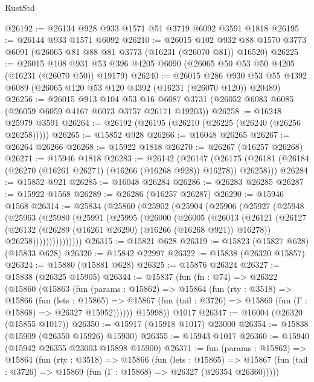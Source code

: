 \begin{lexlean}{RustStd}
\begin{coremodule}
@26192 := @26134 @928 @933 @1571 @51 @3719 @6092 @3591 @1818
@26195 := @26144 @933 @1571 @6092
@26210 := @26015
    @102
    @932
    @88
    @1570
    @3773
    @6091
    (@26065 @81 @88 @81 @3773 (@16231 (@26070 @81)) @16520)
@26225 := @26015
    @108
    @931
    @53
    @396
    @4205
    @6090
    (@26065 @50 @53 @50 @4205 (@16231 (@26070 @50)) @19179)
@26240 := @26015
    @286
    @930
    @53
    @55
    @4392
    @6089
    (@26065 @120 @53 @120 @4392 (@16231 (@26070 @120)) @20489)
@26256 := @26015
    @913
    @104
    @53
    @16
    @6087
    @3731
    (@26052 @6083 @6085 (@26059 @6059 @4167 @6073 @3757 @26171 @19203))
@26258 := @16248 @25979 @3591
@26264 := @26192 (@26195 (@26210 (@26225 (@26240 (@26256 @26258)))))
@26265 := @15852 @928
@26266 := @16048 @26265
@26267 := @26264 @26266
@26268 := @15922 @1818
@26270 := @26267 (@16257 @26268)
@26271 := @15946 @1818
@26283 := @26142
    (@26147
      (@26175 (@26181 (@26184 (@26270 (@16261 @26271) (@16266 (@16268 @928)) @16278)) @26258)))
@26284 := @15852 @921
@26285 := @16048 @26284
@26286 := @26283 @26285
@26287 := @15922 @1568
@26289 := @26286 (@16257 @26287)
@26290 := @15946 @1568
@26314 := @25834
    (@25860
      (@25902
        (@25904
          (@25906
            (@25927
              (@25948
                (@25963
                  (@25980
                    (@25991
                      (@25995
                        (@26000
                          (@26005
                            (@26013
                              (@26121
                                (@26127
                                  (@26132 (@26289 (@16261 @26290) (@16266 (@16268 @921)) @16278))
                                  @26258)))))))))))))))
@26315 := @15821 @628
@26319 := @15823 (@15827 @628) (@15833 @628)
@26320 := @15842 @22997
@26322 := @15838 (@26320 @15857)
@26324 := @15880 (@15881 @628)
@26325 := @15876 @26324
@26327 := @15838 (@26325 @15905)
@26344 := @15837
    (fun (fn : @74) =>
    @26322
      (@15860
        (@15863
          (fun (params : @15862) =>
          @15864
            (fun (rty : @3518) =>
            @15866
              (fun (lets : @15865) =>
              @15867 (fun (tail : @3726) => @15869 (fun (Γ : @15868) => @26327 @15952))))))
        @15998))
    @1017
@26347 := @16004 (@26320 (@15855 @1017))
@26350 := @15917 (@15918 @1017) @23000
@26354 := @15838 (@15909 (@26350 @15926) @15930)
@26355 := @15943 @1017
@26360 := @15940 (@15942 @26355 @23003 @15898 @15900)
@26371 := fun (params : @15862) =>
  @15864
    (fun (rty : @3518) =>
    @15866
      (fun (lets : @15865) =>
      @15867 (fun (tail : @3726) => @15869 (fun (Γ : @15868) => @26327 (@26354 @26360)))))

\end{coremodule}
\end{lexlean}
